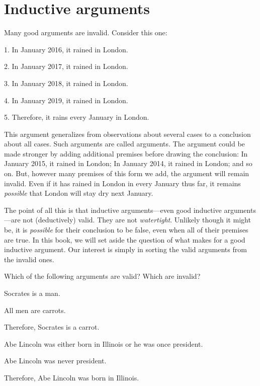 \section{Inductive arguments}
Many good arguments are invalid. Consider this one:
	\begin{earg}
		\item[1.] In January 2016, it rained in London.
		\item[2.] In January 2017, it rained in London.
		\item[3.] In January 2018, it rained in London.
		\item[4.] In January 2019, it rained in London.
	\item[5.] Therefore, it rains every January in London.
\end{earg}
This argument generalizes from observations about several cases to a conclusion about all cases. Such arguments are called  arguments. The argument could be made stronger by adding additional premises before drawing the conclusion: In January 2015, it rained in London; In January 2014, it rained in London; and so on. But, however many premises of this form we add, the argument will remain invalid. Even if it has rained in London in every January thus far, it remains \emph{possible} that London will stay dry next January.

The point of all this is that inductive arguments---even good inductive arguments---are not (deductively) valid. They are not \emph{watertight}. Unlikely though it might be, it is \emph{possible} for their conclusion to be false, even when all of their premises are true. In this book, we will set aside the question of what makes for a good inductive argument. Our interest is simply in sorting the valid arguments from the invalid ones.  


\practiceproblems
\problempart
Which of the following arguments are valid? Which are invalid?

\begin{earg}
\item Socrates is a man.
\item All men are carrots.
\item Therefore, Socrates is a carrot.
\end{earg}

\begin{earg}
\item Abe Lincoln was either born in Illinois or he was once president.
\item Abe Lincoln was never president.
\item Therefore, Abe Lincoln was born in Illinois.
\end{earg}

